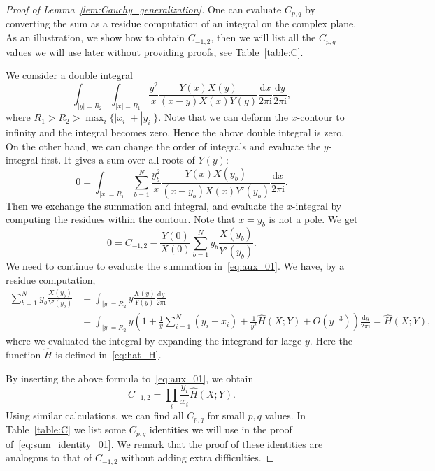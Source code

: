 \documentclass{article}
\numberwithin{equation}{section}
\newcommand{\ddbar}[2]{\frac{{\mathrm d}#1}{2\pi {\mathrm i}#2}}
\begin{document}
\begin{proof}[Proof of Lemma~\ref{lem:Cauchy_generalization}]
One can evaluate $C_{p,q}$ by converting the sum as a residue computation of an integral on the complex plane. As an illustration, we show how to obtain $C_{-1,2}$, then we will list all the $C_{p,q}$ values we will use later without providing proofs, see Table~\ref{table:C}.

We consider a double integral
\begin{equation*}
	\int_{|y|=R_2} \int_{|x|=R_1} \frac{y^2}{x} \frac{Y(x)X(y)}{(x-y)X(x)Y(y)} \ddbar{x}{} \ddbar{y}{},
\end{equation*}
where $R_1>R_2> \max_i\{|x_i|+|y_i|\}$. Note that we can deform the $x$-contour to infinity and the integral becomes zero. Hence the above double integral is zero. On the other hand, we can change the order of integrals and evaluate the $y$-integral first. It gives a sum over all roots of $Y(y)$:
\begin{equation*}
	0= \int_{|x|=R_1} \sum_{b=1}^N \frac{y_b^2}{x} \frac{Y(x)X(y_b)}{(x-y_b) X(x) Y'(y_b)} \ddbar{x}{}.
\end{equation*}
Then we exchange the summation and integral, and evaluate the $x$-integral by computing the residues within the contour. Note that $x=y_b$ is not a pole. We get
\begin{equation}
	\label{eq:aux_01}
	0=C_{-1,2} -\frac{Y(0)}{X(0)} \sum_{b=1}^N y_b\frac{X(y_b)}{Y'(y_b)}.
\end{equation}
We need to continue to evaluate the summation in~\eqref{eq:aux_01}. We have, by a residue computation,
\begin{equation*}
	\begin{split}
	\sum_{b=1}^N y_b\frac{X(y_b)}{Y'(y_b)}&= \int_{|y|=R_2}y\frac{X(y)}{Y(y)}\ddbar{y}{}\\
	&= \int_{|y|=R_2} y\left(1+\frac{1}{y}\sum_{i=1}^N(y_i-x_i)+\frac{1}{y^2}\hat H(X;Y) +O(y^{-3})\right)\ddbar{y}{}
	 = \hat H(X;Y),
\end{split}
\end{equation*}
where we evaluated the integral by expanding the integrand for large $y$. Here the function $\hat H$ is defined in~\eqref{eq:hat_H}. 

By inserting the above formula to~\eqref{eq:aux_01}, we obtain
\begin{equation*}
	C_{-1,2}=\prod_i\frac{y_i}{x_i}\hat H(X;Y).
\end{equation*}
Using similar calculations, we can find all $C_{p,q}$ for small $p,q$ values. In Table~\ref{table:C} we list some $C_{p,q}$ identities we will use in the proof of~\eqref{eq:sum_identity_01}. We remark that the proof of these identities are analogous to that of $C_{-1,2}$ without adding extra difficulties.


\end{proof}
\end{document}
